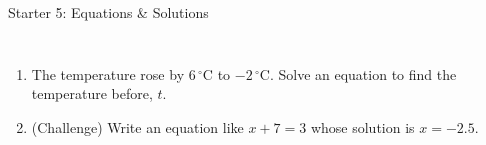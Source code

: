 \documentclass{beamer}
\newcommand{\ashow}[1]{\uncover<2->{\textcolor{red}{\small #1}}}
\newcommand{\tightlist}{%
  \setlength{\itemsep}{0pt}\setlength{\parskip}{0pt}\setlength{\topsep}{0pt}%
}
\newenvironment{subqs}
  {\begin{enumerate}\tightlist\setcounter{enumii}{\value{enumi}}}
  {\setcounter{enumi}{\value{enumii}}\end{enumerate}}
\newcommand{\dC}[1]{$#1\,^{\circ}$C}
\begin{document}
\begin{frame}[t]{Starter 5: Equations \& Solutions}
\begin{columns}[T,onlytextwidth]
\begin{enumerate}
\begin{subqs}
  \end{subqs}
  \item The temperature rose by \dC{6} to \dC{-2}. Solve an equation to find
        the temperature before, $t$.
        \ashow{$t+6=-2$, \; $t=-8$}
  \item (Challenge) Write an equation like $x+7=3$ whose solution is
        $x=-2.5$.
        \ashow{For example $x+4=1.5$}
\end{enumerate}
\end{columns}
\end{frame}

\end{document}
